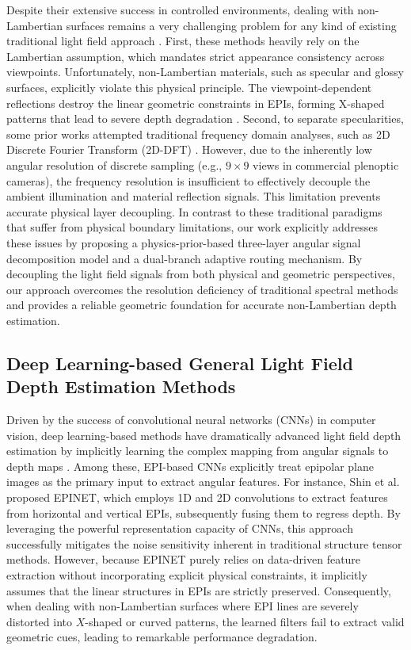 \documentclass[lettersize,journal]{IEEEtran}
\begin{document}
Despite their extensive success in controlled environments, dealing with non-Lambertian surfaces remains a very challenging problem for any kind of existing traditional light field approach \cite{non_lambertian_surfaces,specular_reflection}. First, these methods heavily rely on the Lambertian assumption, which mandates strict appearance consistency across viewpoints. Unfortunately, non-Lambertian materials, such as specular and glossy surfaces, explicitly violate this physical principle. The viewpoint-dependent reflections destroy the linear geometric constraints in EPIs, forming X-shaped patterns that lead to severe depth degradation \cite{x_shaped_patterns,geometric_constraints}. Second, to separate specularities, some prior works attempted traditional frequency domain analyses, such as 2D Discrete Fourier Transform (2D-DFT) \cite{2d_dft,frequency_domain}. However, due to the inherently low angular resolution of discrete sampling (e.g., $9 \times 9$ views in commercial plenoptic cameras), the frequency resolution is insufficient to effectively decouple the ambient illumination and material reflection signals. This limitation prevents accurate physical layer decoupling. In contrast to these traditional paradigms that suffer from physical boundary limitations, our work explicitly addresses these issues by proposing a physics-prior-based three-layer angular signal decomposition model and a dual-branch adaptive routing mechanism. By decoupling the light field signals from both physical and geometric perspectives, our approach overcomes the resolution deficiency of traditional spectral methods and provides a reliable geometric foundation for accurate non-Lambertian depth estimation.

\subsection{Deep Learning-based General Light Field Depth Estimation Methods}

Driven by the success of convolutional neural networks (CNNs) in computer vision, deep learning-based methods have dramatically advanced light field depth estimation by implicitly learning the complex mapping from angular signals to depth maps \cite{deep_learning,light_field_depth_estimation}. Among these, EPI-based CNNs explicitly treat epipolar plane images as the primary input to extract angular features. For instance, Shin et al. \cite{Shin,EPINET} proposed EPINET, which employs 1D and 2D convolutions to extract features from horizontal and vertical EPIs, subsequently fusing them to regress depth. By leveraging the powerful representation capacity of CNNs, this approach successfully mitigates the noise sensitivity inherent in traditional structure tensor methods. However, because EPINET purely relies on data-driven feature extraction without incorporating explicit physical constraints, it implicitly assumes that the linear structures in EPIs are strictly preserved. Consequently, when dealing with non-Lambertian surfaces where EPI lines are severely distorted into $X$-shaped or curved patterns, the learned filters fail to extract valid geometric cues, leading to remarkable performance degradation.
\end{document}
